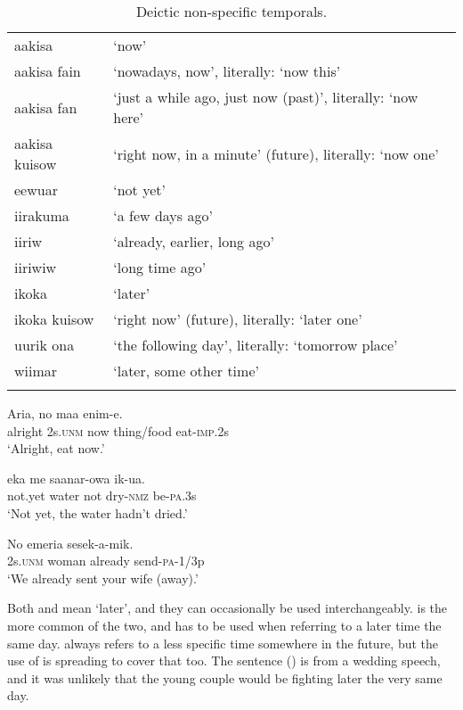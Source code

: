\begin{table}
\begin{tabular}{ll}
\mytoprule
aakisa &`now'\\
aakisa fain &`nowadays, now', literally: `now this'\\
aakisa fan &`just a while ago, just now (past)', literally: `now here'\\
aakisa kuisow &`right now, in a minute' (future), literally: `now one'\\
eewuar &`not yet'\\
iirakuma &`a few days ago'\\
iiriw &`already, earlier, long ago'\\
iiriwiw &`long time ago'\\
ikoka &`later'\\
ikoka kuisow &`right now' (future), literally: `later one'\\
uurik ona &`the following day', literally: `tomorrow place'\\
wiimar &`later, some other time'\\
\mybottomrule
\end{tabular}
\caption{Deictic non-specific temporals.}
\label{tab:3:deicticnonspecifictemporals}
\end{table}

\ea%
\label{ex:x473}
\gll Aria, no  maa enim-e. \\
alright 2s.\textsc{unm} now thing/food eat-\textsc{imp}.2s\\
\glt`Alright, eat now.'
\z

\ea%
\label{ex:x1215}
\gll {}  eka me saanar-owa ik-ua. \\
not.yet water not dry-\textsc{nmz} be-\textsc{pa}.3s\\
\glt`Not yet, the water hadn't dried.'
\z

\ea%
\label{ex:x474}
\gll No emeria  sesek-a-mik. \\
2s.\textsc{unm} woman already send-\textsc{pa}-1/3p\\
\glt`We already sent your wife (away).'
\z

Both  and  mean `later', and they can occasionally be used interchangeably.  is the more common of the two, and has to be used when referring to a later time the same day.  always refers to a less specific time somewhere in the future, but the use of  is spreading to cover that too. The sentence () is from a wedding speech, and it was unlikely that the young couple would be fighting later the very same day.

